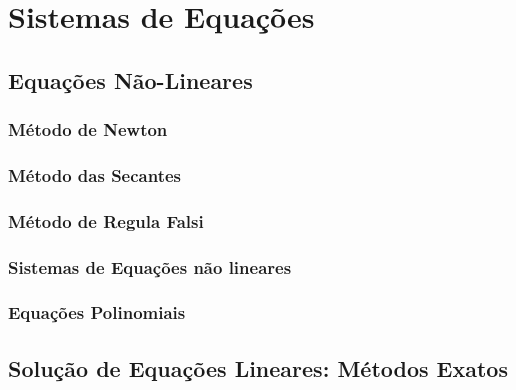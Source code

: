 \documentclass[
]{book}
\begin{document}
\hypertarget{sistemas-de-equauxe7uxf5es}{%
\chapter{Sistemas de Equações}\label{sistemas-de-equauxe7uxf5es}}

\hypertarget{equauxe7uxf5es-nuxe3o-lineares}{%
\section{Equações Não-Lineares}\label{equauxe7uxf5es-nuxe3o-lineares}}

\hypertarget{muxe9todo-de-newton}{%
\subsection{Método de Newton}\label{muxe9todo-de-newton}}

\hypertarget{muxe9todo-das-secantes}{%
\subsection{Método das Secantes}\label{muxe9todo-das-secantes}}

\hypertarget{muxe9todo-de-regula-falsi}{%
\subsection{Método de Regula Falsi}\label{muxe9todo-de-regula-falsi}}

\hypertarget{sistemas-de-equauxe7uxf5es-nuxe3o-lineares}{%
\subsection{Sistemas de Equações não lineares}\label{sistemas-de-equauxe7uxf5es-nuxe3o-lineares}}

\hypertarget{equauxe7uxf5es-polinomiais}{%
\subsection{Equações Polinomiais}\label{equauxe7uxf5es-polinomiais}}

\hypertarget{soluuxe7uxe3o-de-equauxe7uxf5es-lineares-muxe9todos-exatos}{%
\section{Solução de Equações Lineares: Métodos Exatos}\label{soluuxe7uxe3o-de-equauxe7uxf5es-lineares-muxe9todos-exatos}}
\end{document}
